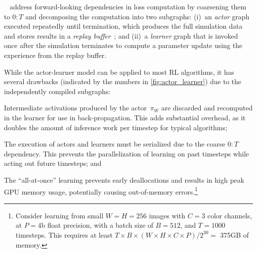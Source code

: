 ~\cite{stooke2019rlpyt, Petrenko2020SampleFE, hoffman2020acme, liang2018rllib, weng2021tianshou, rl-games2022, bou2023torchrl} address forward-looking dependencies in loss computation by coarsening them to $0\!:\!T$ and decomposing the computation into two subgraphs: (i)~an \emph{actor} graph executed repeatedly until termination, which produces the full simulation data and stores results in a \emph{replay buffer}~\cite{cassirer2021reverb, wang2023gear}; and (ii)~a \emph{learner} graph that is invoked once after the simulation terminates to compute a parameter update using the experience from the replay buffer.

While the actor-learner model can be applied to most RL algorithms, it has several drawbacks (indicated by the numbers in \F\ref{fig:actor_learner}) due to the independently compiled subgraphs:

 Intermediate activations produced by the actor~$\pi_{W}$ are discarded and recomputed in the learner for use in back-propagation. This adds substantial overhead, as it doubles the amount of inference work per timestep for typical algorithms; %

 The execution of actors and learners must be serialized due to the coarse $0\!:\!T$ dependency. This prevents the parallelization of learning on past timesteps while acting out future timesteps; and

 The ``all-at-once'' learning prevents early deallocations and results in high peak GPU memory usage, potentially causing out-of-memory errors.\footnote{Consider learning from small $W\!=\!H\!=\!256$ images with $C\!=\!3$ color channels, at $P\!=\!4$b float precision, with a batch size of $B\!=\!512$, and $T\!=\!1000$ timesteps. This requires  at least $T\!\times\!B\!\times\!(W\!\times\!H\!\times\!C\!\times\!P) / 2^{30}=$ 375\unit{GB} of memory.}

